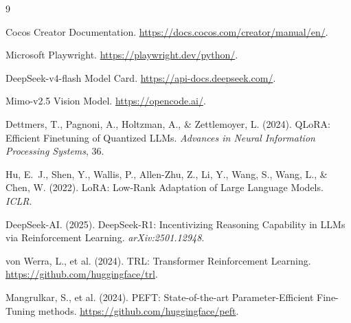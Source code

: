 \documentclass[11pt,a4paper]{article}
\begin{document}
\begin{thebibliography}{9}

Cocos Creator Documentation. \url{https://docs.cocos.com/creator/manual/en/}.

Microsoft Playwright. \url{https://playwright.dev/python/}.

DeepSeek-v4-flash Model Card. \url{https://api-docs.deepseek.com/}.

Mimo-v2.5 Vision Model. \url{https://opencode.ai/}.

Dettmers, T., Pagnoni, A., Holtzman, A., \& Zettlemoyer, L. (2024). QLoRA: Efficient Finetuning of Quantized LLMs. \textit{Advances in Neural Information Processing Systems}, 36.

Hu, E.~J., Shen, Y., Wallis, P., Allen-Zhu, Z., Li, Y., Wang, S., Wang, L., \& Chen, W. (2022). LoRA: Low-Rank Adaptation of Large Language Models. \textit{ICLR}.

DeepSeek-AI. (2025). DeepSeek-R1: Incentivizing Reasoning Capability in LLMs via Reinforcement Learning. \textit{arXiv:2501.12948}.

von Werra, L., et al. (2024). TRL: Transformer Reinforcement Learning. \url{https://github.com/huggingface/trl}.

Mangrulkar, S., et al. (2024). PEFT: State-of-the-art Parameter-Efficient Fine-Tuning methods. \url{https://github.com/huggingface/peft}.

\end{thebibliography}
\end{document}

